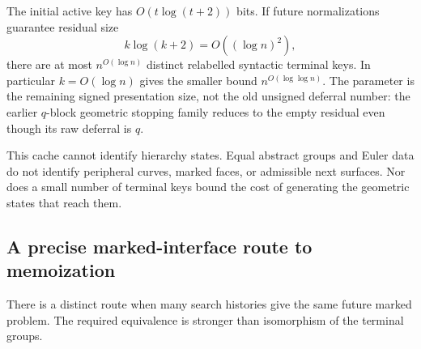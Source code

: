 The initial active key has $O(t\log(t+2))$ bits.  If future normalizations
guarantee residual size
\[
       k\log(k+2)=O((\log n)^2),
\]
there are at most $n^{O(\log n)}$ distinct relabelled syntactic terminal
keys.  In particular $k=O(\log n)$ gives the smaller bound
$n^{O(\log\log n)}$.  The parameter is the remaining signed
presentation size, not the old unsigned deferral number: the earlier
$q$-block geometric stopping family reduces to the empty residual even
though its raw deferral is $q$.

This cache cannot identify hierarchy states.  Equal abstract groups and
Euler data do not identify peripheral curves, marked faces, or admissible
next surfaces.  Nor does a small number of terminal keys bound the cost
of generating the geometric states that reach them.

\subsection{A precise marked-interface route to memoization}

There is a distinct route when many search histories give the same
future marked problem.  The required equivalence is stronger than
isomorphism of the terminal groups.

